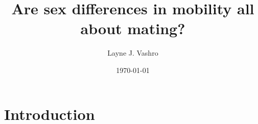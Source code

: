 \documentclass{beamer}
\title[Traveling for mates]{Are sex differences in mobility all about mating?} %
\author{Layne J. Vashro} %
\institute[Utah] %
{
University of Utah \\ %
\medskip
\textit{Layne.Vashro@anthro.utah.edu} %
}
\date{\today} %
\begin{document}
\begin{frame}
\titlepage %
\end{frame}




\section{Introduction}

\end{document}
